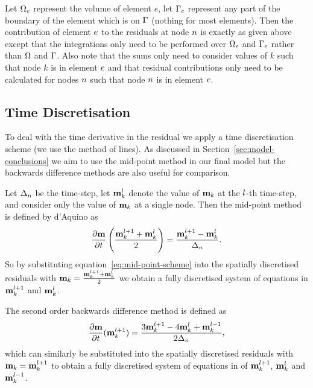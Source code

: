 Let $\Omega_e$ represent the volume of element $e$, let ${\Gamma}_e$ represent any part of the boundary of the element which is on ${\Gamma}$ (nothing for most elements). Then the contribution of element $e$ to the residuals at node $n$ is exactly as given above except that the integrations only need to be performed over $\Omega_e$ and ${\Gamma}_e$ rather than $\Omega$ and ${\Gamma}$. Also note that the sums only need to consider values of $k$ such that node $k$ is in element $e$ and that residual contributions only need to be calculated for nodes $n$ such that node $n$ is in element $e$.


\subsection{Time Discretisation}
\label{sec:time-discretisation-resi}

To deal with the time derivative in the residual we apply a time discretisation scheme (\ie we use the method of lines). As discussed in Section~\ref{sec:model-conclusions} we aim to use the mid-point method in our final model but the backwards difference methods are also useful for comparison.

Let $\Delta_{n}$ be the time-step, let $\mathbf{m}_k^l$ denote the value of $\mathbf{m}_k$ at the $l$-th time-step, and consider only the value of $\mathbf{m}_k$ at a single node. Then the mid-point method is defined by d'Aquino\cite{DAquino2005} as
\begin{equation}
  \label{eq:mid-point-scheme}
  \frac{\partial \mathbf{m}}{\partial t} \left( \frac{\mathbf{m}_k^{l+1} + \mathbf{m}_k^l}{2} \right) = \frac{\mathbf{m}_k^{l+1} - \mathbf{m}_k^l}{ \Delta_{n}}.
\end{equation}
So by substituting equation~\eqref{eq:mid-point-scheme} into  the spatially discretised residuals with $\mathbf{m}_k = \frac{\mathbf{m}_k^{l+1} + \mathbf{m}^l_k}{2}$ we obtain a fully discretised system of equations in  $\mathbf{m}_k^{l+1}$ and $\mathbf{m}_k^l$.

The second order backwards difference method is defined as\cite{Atkinson2009}
\begin{equation}
  \label{eq:bdf2-scheme}
  \frac{\partial \mathbf{m}}{\partial t}(\mathbf{m}_k^{l+1}) = \frac{3 \mathbf{m}_k^{l+1} - 4 \mathbf{m}_k^{l} + \mathbf{m}_k^{l-1}}{2\Delta_{n}},
\end{equation}
which can similarly be substituted into the spatially discretised residuals with $\mathbf{m}_k = \mathbf{m}_k^{l+1}$ to obtain a fully discretised system of equations in of $\mathbf{m}_k^{l+1}$, $\mathbf{m}_k^l$ and $\mathbf{m}_k^{l-1}$.



